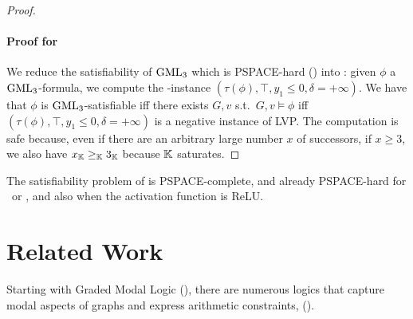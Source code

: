 \begin{proof}
\paragraph{Proof for \caseminustwothree} 
 We reduce the satisfiability of $\text{GML}_3$ which is PSPACE-hard () into \LVPdual: given $\phi$ a $\text{GML}_3$-formula, we compute the \LVPdual-instance $(\tau(\phi), \top, y_1 \leq 0, \delta{=}{+\infty})$.
We have that $\phi$ is $\text{GML}_3$-satisfiable iff there exists $G, v$ s.t.\ $G, v \models \phi$ iff $(\tau(\phi), \top, y_1 \leq 0, \delta{=}{+\infty})$ is a negative instance of LVP. 
The computation is safe because, even if there are an arbitrary large number $x$ of successors, if $x \geq 3$, we also have $x_{\mathbb K} \geq_{\mathbb K}  3_{\mathbb K}$ because $\mathbb K$ saturates.
\end{proof}



\begin{corollary}
\label{corollary-satthelogicPSPACEc}
The satisfiability problem of \thelogic{} is PSPACE-complete, and already PSPACE-hard for \casezerotwoatwo\ or \caseminustwothree, and also when the activation function is ReLU.
\end{corollary}






\section{Related Work}
\label{sec:relatedwork}
Starting with Graded Modal Logic  (\cite{DBLP:journals/ndjfl/Fine72}),
there are numerous logics that capture modal aspects of graphs and express arithmetic constraints, (\cite{
DBLP:journals/japll/DemriL10,
DBLP:conf/frocos/BaaderB19,
DBLP:conf/fsttcs/BednarczykOPT21,
DBLP:conf/kr/GallianiKT23,
DBLP:journals/bsl/BenthemI23}). 

